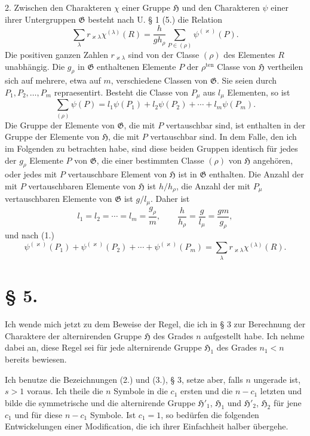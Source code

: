 \documentclass[11pt]{article}
\newcommand{\Hgr}{\mathfrak{H}}
\newcommand{\Ggr}{\mathfrak{G}}
\newcommand{\ten}{\mathrm{ten}}
\begin{document}
2. Zwischen den Charakteren $\chi$ einer Gruppe $\Hgr$ und den Charakteren $\psi$ einer ihrer Untergruppen $\Ggr$ besteht nach U. § 1 (5.) die Relation
\begin{equation}\tag{1.}
 \sum_\lambda r_{\varkappa\lambda}\chi^{(\lambda)}(R)=\frac{h}{g h_\rho}\sum_{P\in(\rho)}\psi^{(\varkappa)}(P).
\end{equation}
Die positiven ganzen Zahlen $r_{\varkappa\lambda}$ sind von der Classe $(\rho)$ des Elementes $R$ unabhängig. Die $g_\rho$ in $\Ggr$ enthaltenen Elemente $P$ der $\rho^{\ten}$ Classe von $\Hgr$ vertheilen sich auf mehrere, etwa auf $m$, verschiedene Classen von $\Ggr$. Sie seien durch $P_1,P_2,\ldots,P_m$ repraesentirt. Besteht die Classe von $P_\mu$ aus $l_\mu$ Elementen, so ist
\[
 \sum_{(\rho)}\psi(P)=l_1\psi(P_1)+l_2\psi(P_2)+\cdots+l_m\psi(P_m).
\]
Die Gruppe der Elemente von $\Ggr$, die mit $P$ vertauschbar sind, ist enthalten in der Gruppe der Elemente von $\Hgr$, die mit $P$ vertauschbar sind. In dem Falle, den ich im Folgenden zu betrachten habe, sind diese beiden Gruppen identisch für jedes der $g_\rho$ Elemente $P$ von $\Ggr$, die einer bestimmten Classe $(\rho)$ von $\Hgr$ angehören, oder jedes mit $P$ vertauschbare Element von $\Hgr$ ist in $\Ggr$ enthalten. Die Anzahl der mit $P$ vertauschbaren Elemente von $\Hgr$ ist $h/h_\rho$, die Anzahl der mit $P_\mu$ vertauschbaren Elemente von $\Ggr$ ist $g/l_\mu$. Daher ist
\[
 l_1=l_2=\cdots=l_m=\frac{g_\rho}{m},	\qquad \frac{h}{h_\rho}=\frac{g}{l_\mu}=\frac{gm}{g_\rho},
\]
und nach (1.)
\begin{equation}\tag{2.}
 \psi^{(\varkappa)}(P_1)+\psi^{(\varkappa)}(P_2)+\cdots+\psi^{(\varkappa)}(P_m)=\sum_\lambda r_{\varkappa\lambda}\chi^{(\lambda)}(R).
\end{equation}

\section*{§ 5.}

Ich wende mich jetzt zu dem Beweise der Regel, die ich in § 3 zur Berechnung der Charaktere der alternirenden Gruppe $\Hgr$ des Grades $n$ aufgestellt habe. Ich nehme dabei an, diese Regel sei für jede alternirende Gruppe $\Hgr_1$ des Grades $n_1<n$ bereits bewiesen.

Ich benutze die Bezeichnungen (2.) und (3.), § 3, setze aber, falls $n$ ungerade ist, $s>1$ voraus. Ich theile die $n$ Symbole in die $c_1$ ersten und die $n-c_1$ letzten und bilde die symmetrische und die alternirende Gruppe $\Hgr'_1$, $\Hgr_1$ und $\Hgr'_2$, $\Hgr_2$ für jene $c_1$ und für diese $n-c_1$ Symbole. Ist $c_1=1$, so bedürfen die folgenden Entwickelungen einer Modification, die ich ihrer Einfachheit halber übergehe.
\end{document}
